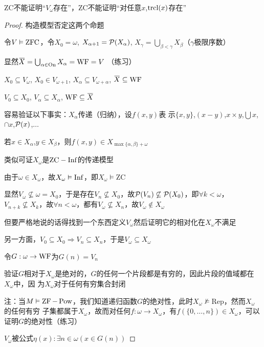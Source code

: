 \documentclass[11pt]{article}
\def \Rep {\text{Rep}}
\def \ZC {\text{ZC}}
\begin{document}
\begin{exercise}[7.10.10]
\(\ZC\)不能证明``\(V_\omega\)存在''，\(\ZC\)不能证明“对任意\(x\),\(\operatorname{\text{trcl}}(x)\)存在”
\end{exercise}

\begin{proof}
构造模型否定这两个命题

令\(V\vDash\operatorname{ZFC}\)，令\(X_0=\omega\), \(X_{\alpha+1}=\mathcal{P}(X_\alpha)\), \(X_\gamma=\bigcup_{\beta<\gamma}X_\beta\)（\(\gamma\)极限序数）

显然\(\barX=\bigcup_{\alpha\in\On}X_\alpha=\WF=V\) （练习）

\(X_0\subseteq V_\omega\), \(X_0\in V_{\omega+1}\), \(X_\alpha\subseteq V_{\omega+\alpha}\), \(\barX\subseteq\WF\)

\(V_0\subseteq X_0\), \(V_\alpha\subseteq X_\alpha\), \(\WF\subseteq\barX\)

容易验证以下事实：\(X_\alpha\)传递（归纳），设\(f(x,y)\)表
示\(\{x,y\}\),\((x-y)\),\(x\times y\),\(\bigcup x\),\(\cap x\),\(\mathcal{P}(x)\),\(\dots\)

若\(x\in X_\alpha\),\(y\in X_\beta\)，则\(f(x,y)\in X_{\max\{\alpha,\beta\}+\omega}\)

类似可证\(X_\omega\)是\(\ZC-\Inf\)的传递模型

由于\(\omega\in X_\omega\)，故\(X_\omega\vDash\operatorname{Inf}\)，即\(X_\omega\vDash\ZC\)

显然\(V_\omega\not\subseteq\omega=X_0\)，于是存在\(V_n\not\subseteq X_0\)，故\(\mathcal{P}(V_n)\not\subseteq\mathcal{P}(X_0)\)，即\(\forall k<\omega\)，
\(V_{n+k}\not\subseteq X_k\)，故\(\forall n<\omega\)，都有\(V_\omega\not\subseteq X_n\)，故\(V_\omega\notin X_\omega\)

但要严格地说的话得找到一个东西定义\(V_\omega\)然后证明它的相对化在\(X_\omega\)不满足

另一方面，\(V_0\subseteq X_0\Rightarrow V_n\subseteq X_n\)，于是\(V_\omega\subseteq X_\omega\)

令\(G:\omega\to\operatorname{WF}\)为\(G(n)=V_n\)

验证\(G\)相对于\(X_\omega\)是绝对的，\(G\)的任何一个片段都是有穷的，因此片段的值域都在\(X_\omega\)中，因
为\(X_\omega\)对于任何有穷集合封闭

注：当\(M\vDash\operatorname{ZF}-\operatorname{Pow}\)，我们知道递归函数\(G\)的绝对性，此时\(X_\omega\not\vDash\Rep\)，然而\(X_\omega\)的任何有穷
子集都属于\(X_\omega\)，故而对任何\(f:\omega\to X_\omega\)，有\(f(\{0,\dots,n\})\in X_\omega\)，可以证明\(G\)的绝对性（练习）

\(V_\omega\)被公式\(\eta(x):\exists n\in\omega(x\in G(n))\)


\end{proof}
\end{document}
